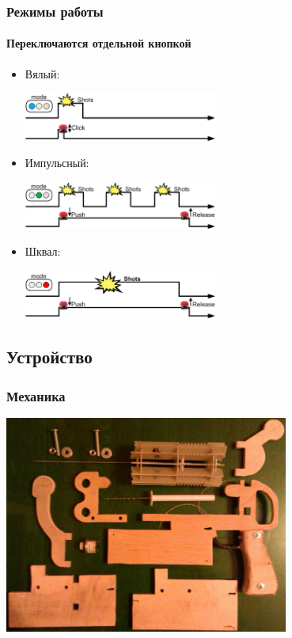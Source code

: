 \begin{frame}
    \frametitle{Режимы работы \myDevice}
    \framesubtitle{Переключаются отдельной кнопкой}
    
    \begin{itemize}
        \item Вялый:
            \begin{center}
                \includegraphics[width=0.5\textwidth]{fig/modeSlow}
            \end{center}
            
        \item Импульсный:
            \begin{center}
                \includegraphics[width=0.5\textwidth]{fig/modePulse}
            \end{center}
            
        \item Шквал:
            \begin{center}
                \includegraphics[width=0.5\textwidth]{fig/modeStorm}
            \end{center}
    \end{itemize}    
\end{frame}


\subsection{Устройство}

\begin{frame}
    \frametitle{Механика \myDevice}
    
    \begin{center}
        \includegraphics[width=0.7\textwidth]{fig/mechanics}
    \end{center}
\end{frame}

